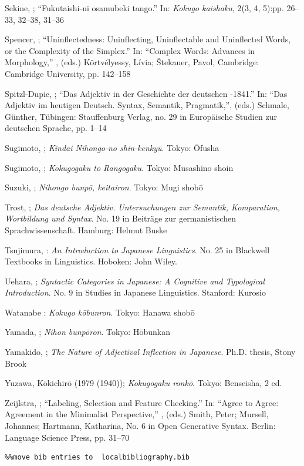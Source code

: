 \documentclass[output=paper]{langscibook}
\begin{document}
Sekine, \citet{Toshio1937}; “Fukutaishi-ni osamubeki tango.” In: \textit{Kokugo kaishaku}, 2(3, 4, 5):pp. 26–33, 32–38, 31–36 

Spencer, \citet{Andrew2020}; “Uninflectedness: Uninflecting, Uninflectable and Uninflected Words, or the Complexity of the Simplex.” In: “Complex Words: Advances in Morphology,” , (eds.) Körtvélyessy, Lívia; Štekauer, Pavol, Cambridge: Cambridge University, pp. 142–158

Spitzl-Dupic, \citet{Friederike2011}; “Das Adjektiv in der Geschichte der deutschen \citealt{Sprachtheorie1764}-1841.” In: “Das Adjektiv im heutigen Deutsch. Syntax, Semantik, Pragmatik,”, (eds.) Schmale, Günther, Tübingen: Stauffenburg Verlag, no. 29 in Europäische Studien zur deutschen Sprache, pp. 1–14 

Sugimoto, \citet{Tsutomu1967}; \textit{Kindai Nihongo-no shin-kenkyū}. Tokyo: Ōfusha 

Sugimoto, \citet{Tsutomu1991}; \textit{Kokugogaku to Rangogaku}. Tokyo: Musashino shoin 

Suzuki, \citet{Shigeyuki1972}; \textit{Nihongo bunpō, keitairon}. Tokyo: Mugi shobō

Trost, \citet{Igor2006a}; \textit{Das deutsche Adjektiv. Untersuchungen zur Semantik, Komparation, Wortbildung und Syntax}. No. 19 in Beiträge zur germanistischen Sprachwissenschaft. Hamburg: Helmut Buske 

Tsujimura, \citet{Natsuko2014}: \textit{An Introduction to Japa\-nese Linguistics}. No. 25 in Blackwell Textbooks in Linguistics. Hoboken: John Wiley.

Uehara, \citet{Satoshi1998}; \textit{Syntactic Categories in Japanese: A Cognitive and Typological Introduction}. No. 9 in Studies in Japanese Linguistics. Stanford: Kurosio 

Watanabe \citet{Minoru1971}: \textit{Kokugo kōbunron}. Tokyo: Hanawa shobō

Yamada, \citet{Yoshio1908}; \textit{Nihon bunpōron}. Tokyo: Hōbunkan 

Yamakido, \citet{Hiroko2005}; \textit{The Nature of Adjectival Inflection in Japanese}. Ph.D. thesis, Stony Brook 

Yuzawa, Kōkichirō (1979 (1940)); \textit{Kokugogaku ronkō}. Tokyo: Benseisha, 2 ed.

Zeijlstra, \citet{Hedde2020}; “Labeling, Selection and Feature Checking.” In: “Agree to Agree: Agreement in the Minimalist Perspective,” , (eds.) Smith, Peter; Mursell, Johannes; Hartmann, Katharina, No. 6 in Open Generative Syntax. Berlin: Language Science Press, pp. 31–70


\begin{verbatim}%%move bib entries to  localbibliography.bib
\end{verbatim}
\sloppy\printbibliography[heading=subbibliography,notkeyword=this]
\end{document}
